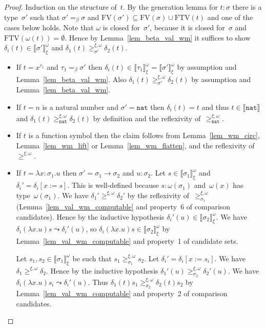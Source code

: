 \documentclass[runningheads,a4paper]{llncs}
\newcommand{\arrtype}{\rightarrow}
\newcommand{\abs}[2]{\lambda #1.#2}
\newcommand{\subst}[2]{#1:=#2}
\newcommand{\FTV}{\mathrm{FTV}}
\newcommand{\FV}{\mathrm{FV}}
\newcommand{\nat}{\mathtt{nat}}
\newcommand{\val}[3]{\ensuremath{\llbracket#1\rrbracket_{#2}^{#3}}}
\newcommand{\gteq}[3]{\ensuremath{\ge_{#1}^{#2,#3}}}
\begin{document}
\begin{proof}
  Induction on the structure of~$t$. By the generation lemma for $t :
  \sigma$ there is a type~$\sigma'$ such that $\sigma' =_\beta \sigma$
  and $\FV(\sigma') \subseteq \FV(\sigma) \cup \FTV(t)$ and one of the
  cases below holds. Note that $\omega$ is closed for~$\sigma'$,
  because it is closed for~$\sigma$ and $\FTV(\omega(t)) =
  \emptyset$. Hence by Lemma~\ref{lem_beta_val_wm} it suffices to show
  $\delta_i(t) \in \val{\sigma'}{\xi}{\omega}$ and $\delta_1(t)
  \gteq{\sigma'}{\xi}{\omega} \delta_2(t)$.
  \begin{itemize}
  \item If $t = x^{\tau_1}$ and $\tau_1 =_\beta \sigma'$ then
    $\delta_i(t) \in \val{\tau_1}{\xi}{\omega} =
    \val{\sigma'}{\xi}{\omega}$ by assumption and
    Lemma~\ref{lem_beta_val_wm}. Also $\delta_1(t)
    \gteq{\sigma'}{\xi}{\omega} \delta_2(t)$ by assumption and
    Lemma~\ref{lem_beta_val_wm}.
  \item If $t = n$ is a natural number and $\sigma' = \nat$ then
    $\delta_i(t) = t$ and thus $t \in \val{\nat}{}{}$ and $\delta_1(t)
    \gteq{\nat}{\xi}{\omega} \delta_2(t)$ by definition and the
    reflexivity of~$\gteq{\nat}{\xi}{\omega}$.
  \item If $t$ is a function symbol then the claim follows from
    Lemma~\ref{lem_wm_circ}, Lemma~\ref{lem_wm_lift} or
    Lemma~\ref{lem_wm_flatten}, and the reflexivity
    of~$\gteq{}{\xi}{\omega}$.
  \item If $t = \abs{x:\sigma_1}{u}$ then $\sigma' =
    \sigma_1\arrtype\sigma_2$ and $u : \sigma_2$. Let $s \in
    \val{\sigma_1}{\xi}{\omega}$ and
    $\delta_i'=\delta_i[\subst{x}{s}]$. This is well-defined because
    $s : \omega(\sigma_1)$ and~$\omega(x)$ has
    type~$\omega(\sigma_1)$. We have $\delta_1' \gteq{}{\xi}{\omega}
    \delta_2'$ by the reflexivity of~$\gteq{\sigma_1}{\xi}{\omega}$
    (Lemma~\ref{lem_val_wm_computable} and property~6 of comparison
    candidates). Hence by the inductive hypothesis $\delta_i'(u) \in
    \val{\sigma_2}{\xi}{\omega}$. We have $\delta_i(\abs{x}{u}) s
    \leadsto \delta_i'(u)$, so $\delta_i(\abs{x}{u}) s \in
    \val{\sigma_2}{\xi}{\omega}$ by Lemma~\ref{lem_val_wm_computable}
    and property~1 of candidate sets.

    Let $s_1,s_2 \in \val{\sigma_1}{\xi}{\omega}$ be such that $s_1
    \gteq{\sigma_1}{\xi}{\omega} s_2$. Let
    $\delta_i'=\delta_i[\subst{x}{s_i}]$. We have $\delta_1
    \gteq{}{\xi}{\omega} \delta_2$. Hence by the inductive hypothesis
    $\delta_1'(u)\gteq{\sigma_2}{\xi}{\omega}\delta_2'(u)$. We have
    $\delta_i(\abs{x}{u}) s_i \leadsto \delta_i'(u)$. Thus
    $\delta_1(t) s_1 \gteq{\sigma_2}{\xi}{\omega} \delta_2(t) s_2$ by
    Lemma~\ref{lem_val_wm_computable} and property~2 of comparison
    candidates.


\end{itemize}
\end{proof}
\end{document}
